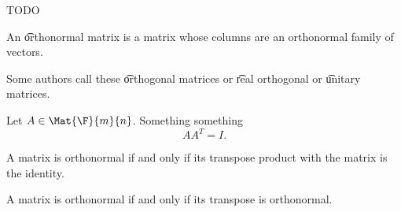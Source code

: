 

TODO


An \t{orthonormal} matrix is a matrix whose columns are an orthonormal family of vectors.

Some authors call these \t{orthogonal} matrices or \t{real orthogonal} or \t{unitary} matrices.


Let $A \in \Mat{\F}{m}{n}$.
Something something
$$
  AA^T = I.
$$


\begin{prop}

  A matrix is orthonormal if and only if its transpose product with the matrix is the identity.

\end{prop}

\begin{prop}

A matrix is orthonormal if and only if its transpose is orthonormal.

\end{prop}
